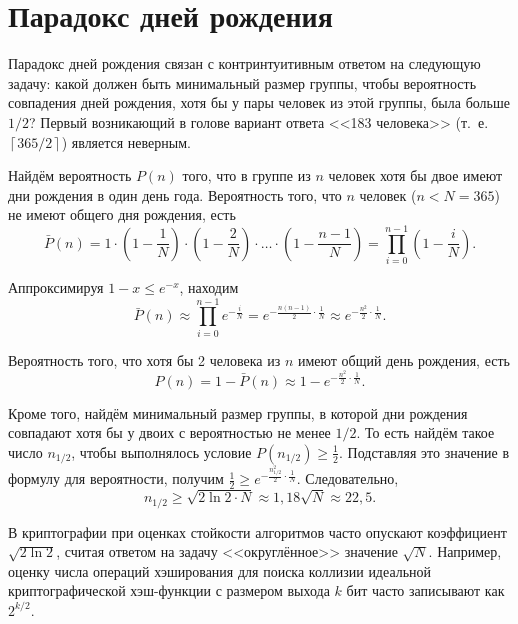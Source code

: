 \section{Парадокс дней рождения}\label{section-birthday-padradox}

Парадокс дней рождения связан с контринтуитивным ответом на следующую задачу: какой должен быть минимальный размер группы, чтобы вероятность совпадения дней рождения, хотя бы у пары человек из этой группы, была больше $1 / 2$? Первый возникающий в голове вариант ответа <<183 человека>> (т.~е. $\left\lceil 365 / 2 \right\rceil$) является неверным.

Найдём вероятность $P(n)$ того, что в группе из $n$ человек хотя бы двое имеют дни рождения в один день года. Вероятность того, что $n$ человек ($n < N = 365$) не имеют общего дня рождения, есть
\[
    \bar{P}(n) = 1 \cdot \left( 1 - \frac{1}{N} \right) \cdot \left(1 - \frac{2}{N} \right)\cdot \dots \cdot  \left( 1 - \frac{n-1}{N} \right) = \prod\limits_{i=0}^{n-1} \left( 1 - \frac{i}{N} \right).
\]

Аппроксимируя $1-x \leq e^{-x}$, находим
    \[ \bar{P}(n) \approx \prod\limits_{i=0}^{n-1} e^{-\frac{i}{N}} = e^{-\frac{n(n-1)}{2} \cdot \frac{1}{N}} \approx e^{-\frac{n^2}{2} \cdot \frac{1}{N}}. \]

Вероятность того, что хотя бы 2 человека из $n$ имеют общий день рождения, есть
    \[ P(n) = 1 - \bar{P}(n) \approx 1 -  e^{-\frac{n^2}{2} \cdot \frac{1}{N}}. \]

Кроме того, найдём минимальный размер группы, в которой дни рождения совпадают хотя бы у двоих с вероятностью не менее $1 / 2$. То есть найдём такое число $n_{1/2}$, чтобы выполнялось условие $P(n_{1/2}) \geq \frac{1}{2}$. Подставляя это значение в формулу для вероятности, получим $\frac{1}{2} \geq e^{-\frac{n_{1/2}^2}{2} \cdot \frac{1}{N}}$. Следовательно,
	\[n_{1/2} \geq \sqrt{2 \ln 2 \cdot N} \approx 1,18 \sqrt{ N } \approx 22,5.\]

В криптографии при оценках стойкости алгоритмов часто опускают коэффициент $\sqrt{2 \ln 2}$, считая ответом на задачу <<округлённое>> значение $\sqrt{ N }$. Например, оценку числа операций хэширования для поиска коллизии идеальной криптографической хэш-функции с размером выхода $k$ бит часто записывают как $2^{k/2}$.

